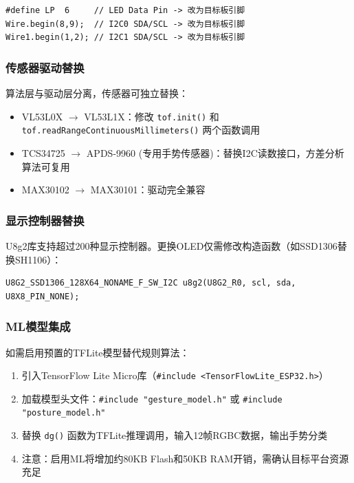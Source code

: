 \documentclass[UTF8,a4paper,12pt]{ctexart}
\begin{document}
\begin{lstlisting}
#define LP  6     // LED Data Pin -> 改为目标板引脚
Wire.begin(8,9);  // I2C0 SDA/SCL -> 改为目标板引脚
Wire1.begin(1,2); // I2C1 SDA/SCL -> 改为目标板引脚
\end{lstlisting}

\subsubsection{传感器驱动替换}

算法层与驱动层分离，传感器可独立替换：

\begin{itemize}
    \item VL53L0X $\to$ VL53L1X：修改 \texttt{tof.init()} 和 \texttt{tof.readRangeContinuousMillimeters()} 两个函数调用
    \item TCS34725 $\to$ APDS-9960 (专用手势传感器)：替换I2C读数接口，方差分析算法可复用
    \item MAX30102 $\to$ MAX30101：驱动完全兼容
\end{itemize}

\subsubsection{显示控制器替换}

U8g2库支持超过200种显示控制器。更换OLED仅需修改构造函数（如SSD1306替换SH1106）：

\begin{lstlisting}
U8G2_SSD1306_128X64_NONAME_F_SW_I2C u8g2(U8G2_R0, scl, sda, U8X8_PIN_NONE);
\end{lstlisting}

\subsubsection{ML模型集成}

如需启用预置的TFLite模型替代规则算法：

\begin{enumerate}[label=(\arabic*),leftmargin=*]
    \item 引入TensorFlow Lite Micro库（\texttt{\#include <TensorFlowLite\_ESP32.h>}）
    \item 加载模型头文件：\texttt{\#include "gesture\_model.h"} 或 \texttt{\#include "posture\_model.h"}
    \item 替换 \texttt{dg()} 函数为TFLite推理调用，输入12帧RGBC数据，输出手势分类
    \item 注意：启用ML将增加约80KB Flash和50KB RAM开销，需确认目标平台资源充足
\end{enumerate}
\end{document}

